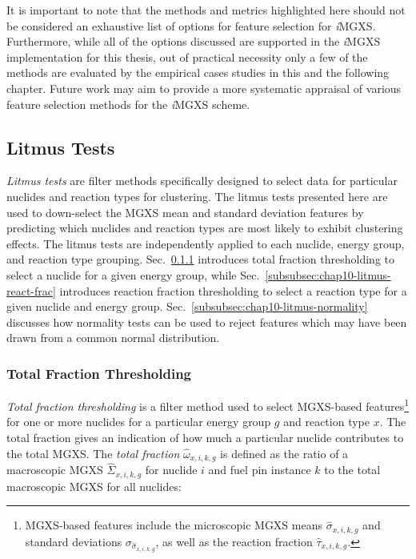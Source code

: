 It is important to note that the methods and metrics highlighted here should not be considered an exhaustive list of options for feature selection for \textit{i}\ac{MGXS}. Furthermore, while all of the options discussed are supported in the \textit{i}\ac{MGXS} implementation for this thesis, out of practical necessity only a few of the methods are evaluated by the empirical cases studies in this and the following chapter. Future work may aim to provide a more systematic appraisal of various feature selection methods for the \textit{i}\ac{MGXS} scheme.

\subsection{Litmus Tests}
\label{subsec:chap10-litmus}

\textit{Litmus tests} are filter methods specifically designed to select data for particular nuclides and reaction types for clustering. The litmus tests presented here are used to down-select the \ac{MGXS} mean and standard deviation features by predicting which nuclides and reaction types are most likely to exhibit clustering effects. The litmus tests are independently applied to each nuclide, energy group, and reaction type grouping. Sec.~\ref{subsubsec:chap10-litmus-tot-frac} introduces total fraction thresholding to select a nuclide for a given energy group, while Sec.~\ref{subsubsec:chap10-litmus-react-frac} introduces reaction fraction thresholding to select a reaction type for a given nuclide and energy group. Sec.~\ref{subsubsec:chap10-litmus-normality} discusses how normality tests can be used to reject features which may have been drawn from a common normal distribution.

\subsubsection{Total Fraction Thresholding}
\label{subsubsec:chap10-litmus-tot-frac}

\textit{Total fraction thresholding} is a filter method used to select \ac{MGXS}-based features\footnote{\ac{MGXS}-based features include the microscopic \ac{MGXS} means $\hat{\sigma}_{x,i,k,g}$ and standard deviations $\sigma_{\hat{\sigma}_{x,i,k,g}}$, as well as the reaction fraction $\hat{\tau}_{x,i,k,g}$.} for one or more nuclides for a particular energy group $g$ and reaction type $x$.
The total fraction gives an indication of how much a particular nuclide contributes to the total \ac{MGXS}. 
The \textit{total fraction} $\hat{\omega}_{x,i,k,g}$ is defined as the ratio of a macroscopic \ac{MGXS} $\hat{\Sigma}_{x,i,k,g}$ for nuclide $i$ and fuel pin instance $k$ to the total macroscopic \ac{MGXS} for all nuclides:

